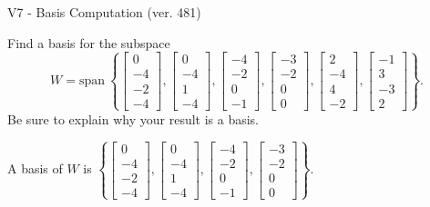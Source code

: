 \begin{exercise}
  \begin{exerciseTitle}V7 - Basis Computation (ver. 481)\end{exerciseTitle}
  \begin{exerciseStatement}
    Find a basis for the subspace 
\[W=\mathrm{span}\ \left\{\left[\begin{array}{r}
0 \\
-4 \\
-2 \\
-4
\end{array}\right] , \left[\begin{array}{r}
0 \\
-4 \\
1 \\
-4
\end{array}\right] , \left[\begin{array}{r}
-4 \\
-2 \\
0 \\
-1
\end{array}\right] , \left[\begin{array}{r}
-3 \\
-2 \\
0 \\
0
\end{array}\right] , \left[\begin{array}{r}
2 \\
-4 \\
4 \\
-2
\end{array}\right] , \left[\begin{array}{r}
-1 \\
3 \\
-3 \\
2
\end{array}\right]\right\}.\]
 Be sure to explain why your result is a basis.


  \end{exerciseStatement}
  \begin{exerciseAnswer}
   A basis of \(W\) is  \(\left\{\left[\begin{array}{r}
0 \\
-4 \\
-2 \\
-4
\end{array}\right] , \left[\begin{array}{r}
0 \\
-4 \\
1 \\
-4
\end{array}\right] , \left[\begin{array}{r}
-4 \\
-2 \\
0 \\
-1
\end{array}\right] , \left[\begin{array}{r}
-3 \\
-2 \\
0 \\
0
\end{array}\right]\right\}\).
  


  \end{exerciseAnswer}
\end{exercise}